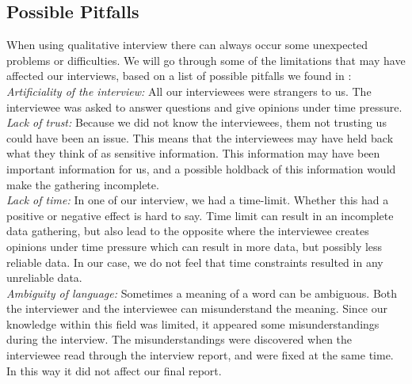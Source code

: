 \subsection{Possible Pitfalls}
When using qualitative interview there can always occur some unexpected problems or difficulties. We will go through some of the limitations that may have affected our interviews, based on a list of possible pitfalls we found in \cite{interview}:\\
\emph{Artificiality of the interview:} All our interviewees were strangers to us. The interviewee was asked to answer questions  and give opinions under time pressure.\\
\emph{Lack of trust:} Because we did not know the interviewees, them not trusting us could have been an issue. This means that the interviewees may have held back what they think of as sensitive information. This information may have been important information for us, and a possible holdback of this information would make the gathering incomplete. \\
\emph{Lack of time:} In one of our interview, we had a time-limit. Whether this had a positive or negative effect is hard to say. Time limit can result in an incomplete data gathering, but also lead to the opposite where the interviewee creates opinions under time pressure which can result in more data, but possibly less reliable data. In our case, we do not feel that time constraints resulted in any unreliable data. \\
\emph{Ambiguity of language:} Sometimes a meaning of a word can be ambiguous. Both the interviewer and the interviewee can misunderstand the meaning. Since our knowledge within this field was limited, it appeared some misunderstandings during the interview. The misunderstandings were discovered when the interviewee read through the interview report, and were fixed at the same time. In this way it did not affect our final report.  

